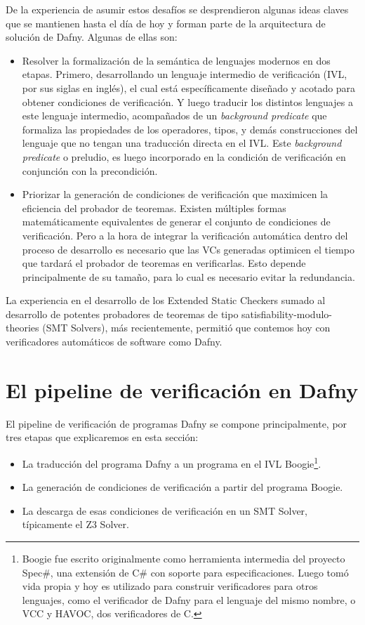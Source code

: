 \documentclass[12pt, a4paper, openany, fleqn]{book}
\begin{document}
    De la experiencia de asumir estos desafíos se desprendieron algunas ideas claves que se mantienen hasta el día de hoy y forman parte de la arquitectura de solución de Dafny. Algunas de ellas son:
    \begin{itemize}
        \item Resolver la formalización de la semántica de lenguajes modernos en dos etapas. Primero, desarrollando un lenguaje intermedio de verificación (IVL, por sus siglas en inglés), el cual está específicamente diseñado y acotado para obtener condiciones de verificación. Y luego traducir los distintos lenguajes a este lenguaje intermedio, acompañados de un \textit{background  predicate} que formaliza las propiedades de los operadores, tipos, y demás construcciones del lenguaje que no tengan una traducción directa en el IVL. Este \textit{background  predicate} o preludio, es luego incorporado en la condición de verificación en conjunción con la precondición.
        \item Priorizar la generación de condiciones de verificación que maximicen la eficiencia del probador de teoremas. Existen múltiples formas matemáticamente equivalentes de generar el conjunto de condiciones de verificación. Pero a la hora de integrar la verificación automática dentro del proceso de desarrollo es necesario que las VCs generadas optimicen el tiempo que tardará el probador de teoremas en verificarlas. Esto depende principalmente de su tamaño, para lo cual es necesario evitar la redundancia.
    \end{itemize}

    La experiencia en el desarrollo de los Extended Static Checkers sumado al desarrollo de potentes probadores de teoremas de tipo satisfiability-modulo-theories (SMT Solvers), más recientemente, permitió que contemos hoy con verificadores automáticos de software como Dafny.

    \section{El pipeline de verificación en Dafny}
    El pipeline de verificación de programas Dafny se compone principalmente, por tres etapas que explicaremos en esta sección:
    \begin{itemize}
        \item La traducción del programa Dafny a un programa en el IVL Boogie\footnote{
            Boogie fue escrito originalmente como herramienta intermedia del proyecto Spec\#, una extensión de C\# con soporte para especificaciones. Luego tomó vida propia y hoy es utilizado para construir verificadores para otros lenguajes, como el verificador de Dafny para el lenguaje del mismo nombre, o VCC y HAVOC, dos verificadores de C.
        }.
        \item La generación de condiciones de verificación a partir del programa Boogie.
        \item La descarga de esas condiciones de verificación en un SMT Solver, típicamente el Z3 Solver.
    \end{itemize}
\end{document}
